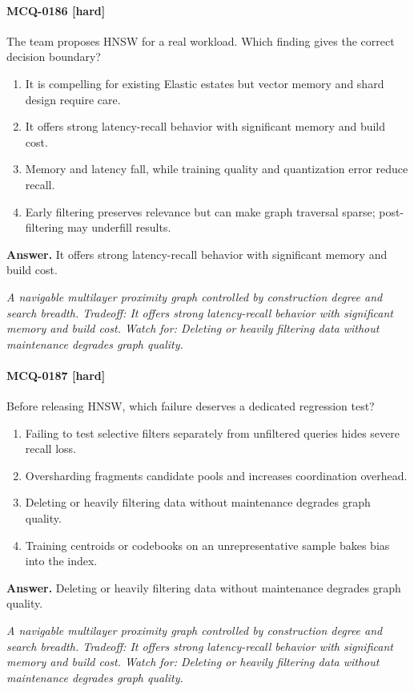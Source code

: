 \paragraph{MCQ-0186 [hard]} The team proposes HNSW for a real workload. Which finding gives the correct decision boundary?
\begin{enumerate}[label=\Alph*.]
\item It is compelling for existing Elastic estates but vector memory and shard design require care.
\item It offers strong latency-recall behavior with significant memory and build cost.
\item Memory and latency fall, while training quality and quantization error reduce recall.
\item Early filtering preserves relevance but can make graph traversal sparse; post-filtering may underfill results.
\end{enumerate}
\noindent\textbf{Answer.} It offers strong latency-recall behavior with significant memory and build cost.
\par\textit{A navigable multilayer proximity graph controlled by construction degree and search breadth. Tradeoff: It offers strong latency-recall behavior with significant memory and build cost. Watch for: Deleting or heavily filtering data without maintenance degrades graph quality.}
\paragraph{MCQ-0187 [hard]} Before releasing HNSW, which failure deserves a dedicated regression test?
\begin{enumerate}[label=\Alph*.]
\item Failing to test selective filters separately from unfiltered queries hides severe recall loss.
\item Oversharding fragments candidate pools and increases coordination overhead.
\item Deleting or heavily filtering data without maintenance degrades graph quality.
\item Training centroids or codebooks on an unrepresentative sample bakes bias into the index.
\end{enumerate}
\noindent\textbf{Answer.} Deleting or heavily filtering data without maintenance degrades graph quality.
\par\textit{A navigable multilayer proximity graph controlled by construction degree and search breadth. Tradeoff: It offers strong latency-recall behavior with significant memory and build cost. Watch for: Deleting or heavily filtering data without maintenance degrades graph quality.}
